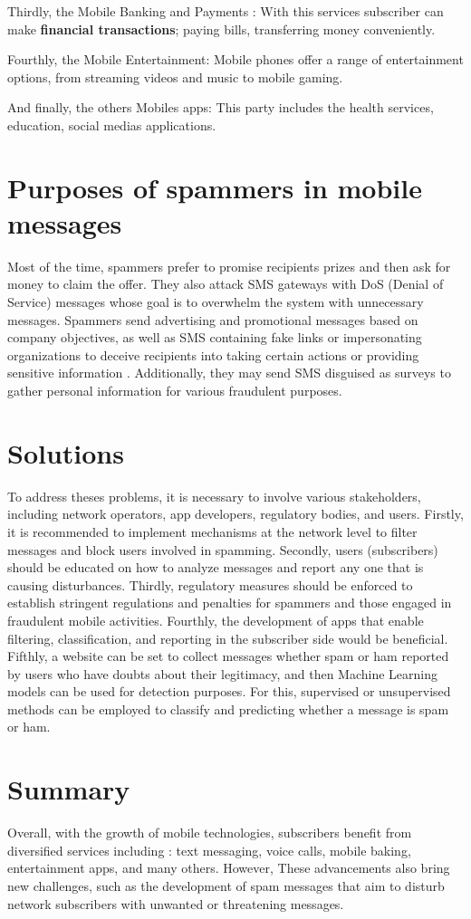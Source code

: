 \documentclass[12pt,a4paper]{report}
\begin{document}
Thirdly, the Mobile Banking and Payments : With this services subscriber can make \textbf{financial transactions}; paying bills, transferring money conveniently. 

Fourthly, the Mobile Entertainment: Mobile phones offer a range of entertainment options, from streaming videos and music to mobile gaming. 

And finally, the others Mobiles apps: This party includes the health services, education, social medias applications.
\section{Purposes of spammers in mobile messages}
Most of the time, spammers prefer to promise recipients prizes and then ask for money to claim the offer. They also attack SMS gateways with DoS (Denial of Service) messages \cite{androulidakis2013fimess} whose goal is to overwhelm the system with unnecessary messages. Spammers send advertising and promotional messages based on company objectives, as well as SMS containing fake links or impersonating organizations to deceive recipients into taking certain actions or providing sensitive information \cite{tang2022clues}. Additionally, they may send SMS disguised as surveys to gather personal information for various fraudulent purposes.
\section{Solutions}
To address theses problems, it is necessary to involve various stakeholders, including network operators, app developers, regulatory bodies, and users. Firstly, it is recommended to implement mechanisms at the network level \cite{hao2009detecting} to filter messages and block users involved in spamming. Secondly, users (subscribers) should be educated on how to analyze messages and report any one that is causing disturbances. Thirdly, regulatory measures should be enforced to establish stringent regulations and penalties for spammers and those engaged in fraudulent mobile activities. Fourthly, the development of apps that enable filtering, classification, and reporting in the subscriber side would be beneficial. Fifthly, a website can be set to collect messages whether spam or ham reported by users who have doubts about their legitimacy, and then Machine Learning models can be used for detection purposes. For this, supervised or unsupervised methods can be employed to classify and predicting whether a message is spam or  ham. 
\section{Summary}
Overall, with the growth of mobile technologies, subscribers benefit from diversified services including : text messaging, voice calls, mobile baking, entertainment apps, and many others. However, These advancements also bring new challenges, such as the development of spam messages that aim to disturb network subscribers with unwanted or threatening messages. 
\end{document}
